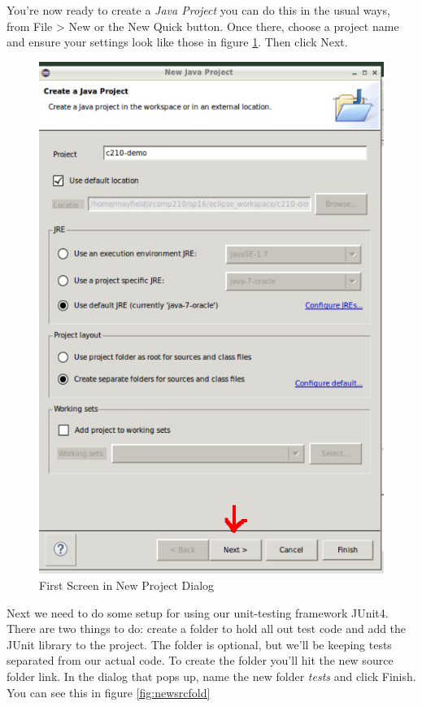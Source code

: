\documentclass[]{tufte-handout}
\begin{document}
You're now ready to create a \textit{Java Project} you can do this in the usual ways, from File > New or the New Quick button. Once there, choose a project name and ensure your settings look like those in figure \ref{fig:newproj}. Then click Next.

\vspace{.1in}
\begin{center}
\begin{figure}[!htb]
\includegraphics[scale=.3]{Eclipse-NewProject.png}
\caption{First Screen in New Project Dialog}
\label{fig:newproj} 
\end{figure}
\end{center}
\vspace{.1in}

Next we need to do some setup for using our unit-testing framework JUnit4. There are two things to do: create a folder to hold all out test code and add the JUnit library to the project. The folder is optional, but we'll be keeping tests separated from our actual code. To create the folder you'll hit the new source folder link. In the dialog that pops up, name the new folder \textit{tests} and click Finish. You can see this in figure \ref{fig:newsrcfold}
\end{document}
